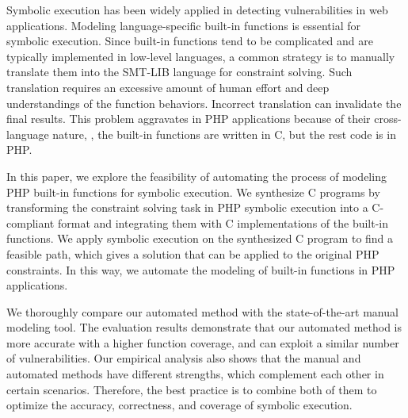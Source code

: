 Symbolic execution has been widely applied in detecting vulnerabilities in web applications.
Modeling language-specific built-in functions is essential for symbolic execution.
Since built-in functions tend to be complicated and are typically implemented in low-level languages, a common strategy is to manually translate them into the SMT-LIB language for constraint solving.
Such translation requires an excessive amount of human effort and deep understandings of the function behaviors.
Incorrect translation can invalidate the final results.
This problem aggravates in PHP applications because of their cross-language nature, \ie{}, the built-in functions are written in C, but the rest code is in PHP.

In this paper, we explore the feasibility of automating the process of modeling PHP built-in functions for symbolic execution.
We synthesize C programs by transforming the constraint solving task in PHP symbolic execution into a C-compliant format and integrating them with C implementations of the built-in functions.
We apply symbolic execution on the synthesized C program to find a feasible path, which gives a solution that can be applied to the original PHP constraints.
In this way, we automate the modeling of built-in functions in PHP applications.

We thoroughly compare our automated method with the state-of-the-art manual modeling tool.
The evaluation results demonstrate that our automated method is more accurate with a higher function coverage, and can exploit a similar number of vulnerabilities.
Our empirical analysis also shows that the manual and automated methods have different strengths, which complement each other in certain scenarios. 
Therefore, the best practice is to combine both of them to optimize the accuracy, correctness, and coverage of symbolic execution. 
